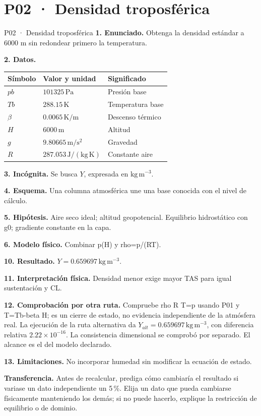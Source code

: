 \chapter*{P02 · Densidad troposférica}
\begin{studiumworked}{P02 · Densidad troposférica}
\textbf{1. Enunciado.} Obtenga la densidad estándar a 6000 m sin redondear primero la temperatura.

\textbf{2. Datos.}
\begin{longtable}{p{.16\linewidth}p{.35\linewidth}p{.38\linewidth}}\toprule Símbolo & Valor y unidad & Significado\\\midrule\endhead
$pb$ & $101325\,\mathrm{Pa}$ & Presión base\\
$Tb$ & $288.15\,\mathrm K$ & Temperatura base\\
$\beta$ & $0.0065\,\mathrm{K/m}$ & Descenso térmico\\
$H$ & $6000\,\mathrm m$ & Altitud\\
$g$ & $9.80665\,\mathrm{m/s^2}$ & Gravedad\\
$R$ & $287.053\,\mathrm{J/(kg\,K)}$ & Constante aire\\
\bottomrule\end{longtable}
\textbf{3. Incógnita.} Se busca $Y$, expresada en $\mathrm{kg\,m^{-3}}$.

\textbf{4. Esquema.} Una columna atmosférica une una base conocida con el nivel de cálculo.

\textbf{5. Hipótesis.} Aire seco ideal; altitud geopotencial. Equilibrio hidrostático con g0; gradiente constante en la capa.

\textbf{6. Modelo físico.} Combinar p(H) y rho=p/(RT).


\textbf{10. Resultado.} $Y=0.659697\,\mathrm{kg\,m^{-3}}$.

\textbf{11. Interpretación física.} Densidad menor exige mayor TAS para igual sustentación y CL.

\textbf{12. Comprobación por otra ruta.} Compruebe rho R T=p usando P01 y T=Tb-beta H; es un cierre de estado, no evidencia independiente de la atmósfera real. La ejecución de la ruta alternativa da $Y_{alt}=0.659697\,\mathrm{kg\,m^{-3}}$, con diferencia relativa $2.22\times10^{-16}$. La consistencia dimensional se comprobó por separado. El alcance es el del modelo declarado.

\textbf{13. Limitaciones.} No incorporar humedad sin modificar la ecuación de estado.

\textbf{Transferencia.} Antes de recalcular, prediga cómo cambiaría el resultado si variase un dato independiente un 5\,\%. Elija un dato que pueda cambiarse físicamente manteniendo los demás; si no puede hacerlo, explique la restricción de equilibrio o de dominio.\par
\end{studiumworked}
